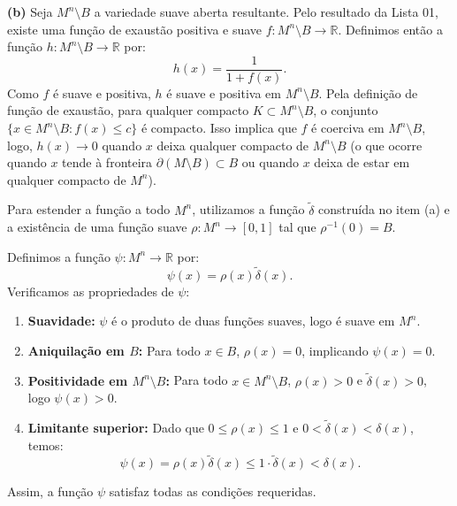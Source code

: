 {	\textbf{(b)} Seja $M^n \setminus B$ a variedade suave aberta resultante. Pelo resultado da Lista 01, existe uma função de exaustão positiva e suave $f : M^n \setminus B \to \mathbb{R}$. Definimos então a função $h : M^n \setminus B \to \mathbb{R}$ por:
	\begin{equation*}
		h(x) = \frac{1}{1 + f(x)}.
	\end{equation*}
	Como $f$ é suave e positiva, $h$ é suave e positiva em $M^n \setminus B$. Pela definição de função de exaustão, para qualquer compacto $K \subset M^n \setminus B$, o conjunto $\{x \in M^n \setminus B : f(x) \le c\}$ é compacto. Isso implica que $f$ é coerciva em $M^n \setminus B$, logo, $h(x) \to 0$ quando $x$ deixa qualquer compacto de $M^n \setminus B$ (o que ocorre quando $x$ tende à fronteira $\partial(M \setminus B) \subset B$ ou quando $x$ deixa de estar em qualquer compacto de $M^n$).
	
	Para estender a função a todo $M^n$, utilizamos a função $\tilde{\delta}$ construída no item (a) e a existência de uma função suave $\rho : M^n \to [0, 1]$ tal que $\rho^{-1}(0) = B$. 
	
	Definimos a função $\psi : M^n \to \mathbb{R}$ por:
	\begin{equation*}
		\psi(x) = \rho(x) \tilde{\delta}(x).
	\end{equation*}
	Verificamos as propriedades de $\psi$:
	\begin{enumerate}
		\item \textbf{Suavidade:} $\psi$ é o produto de duas funções suaves, logo é suave em $M^n$.
		\item \textbf{Aniquilação em $B$:} Para todo $x \in B$, $\rho(x) = 0$, implicando $\psi(x) = 0$.
		\item \textbf{Positividade em $M^n \setminus B$:} Para todo $x \in M^n \setminus B$, $\rho(x) > 0$ e $\tilde{\delta}(x) > 0$, logo $\psi(x) > 0$.
		\item \textbf{Limitante superior:} Dado que $0 \le \rho(x) \le 1$ e $0 < \tilde{\delta}(x) < \delta(x)$, temos:
		\begin{equation*}
			\psi(x) = \rho(x) \tilde{\delta}(x) \le 1 \cdot \tilde{\delta}(x) < \delta(x).
		\end{equation*}
	\end{enumerate}
	Assim, a função $\psi$ satisfaz todas as condições requeridas.
}
